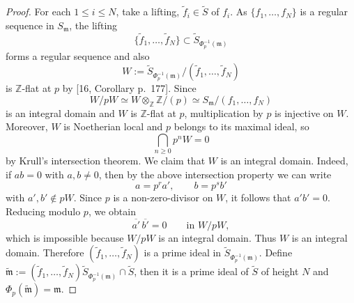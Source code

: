 \documentclass[10pt,a4paper]{amsart}
\newcommand{\m}{{\mathfrak{m}}}
\newcommand{\tf}{{\tilde f}}
\newcommand{\wm}{{\widetilde\m}}
\newcommand{\ws}{{\widetilde{S}}}
\begin{document}
\begin{proof} For each $1\leq i\leq N$, take a lifting, $\tf_i\in \ws$ of $f_i$.
     As $\{f_1,\ldots,f_N \}$ is a regular sequence in $S_\m$, the lifting 
     $$\{\tf_1,\ldots, \tf_N\}\subset \ws_{\Phi_p^{-1}(\m)}$$
     forms a regular sequence and also
   \[
W:=\widetilde{S}_{\Phi_p^{-1}(\mathfrak m)}/(\widetilde f_1,\dots,\widetilde f_N)
\]
is $\mathbb Z$-flat at $p$ by [16, Corollary p.~177]. Since
\[
W/pW \simeq W\otimes_{\mathbb Z}\mathbb Z/(p)
 \simeq S_{\mathfrak m}/(f_1,\dots,f_N)
\]
is an integral domain and $W$ is $\mathbb Z$-flat at $p$, multiplication by $p$
is injective on $W$. Moreover, $W$ is Noetherian local and $p$ belongs to its
maximal ideal, so
\[
\bigcap_{n\ge 0} p^nW = 0
\]
by Krull's intersection theorem. We claim that $W$ is an integral domain.
Indeed, if $ab=0$ with $a,b\neq 0$, then by the above intersection property we
can write
\[
a=p^r a', \qquad b=p^s b'
\]
with $a',b'\notin pW$. Since $p$ is a non-zero-divisor on $W$, it follows that
$a'b'=0$. Reducing modulo $p$, we obtain
\[
\overline{a'}\,\overline{b'}=0 \qquad \text{in } W/pW,
\]
which is impossible because $W/pW$ is an integral domain. Thus $W$ is an
integral domain. Therefore $(\widetilde f_1,\dots,\widetilde f_N)$ is a prime
ideal in $\widetilde{S}_{\Phi_p^{-1}(\mathfrak m)}$.
     Define $\wm:=(\tf_1,\ldots, \tf_N)\ws_{\Phi_p^{-1}(\m)}\cap \ws$,
     then it is a prime ideal of $\ws$ of height $N$ and $\Phi_p(\wm)=\m$.
\end{proof}
\end{document}
